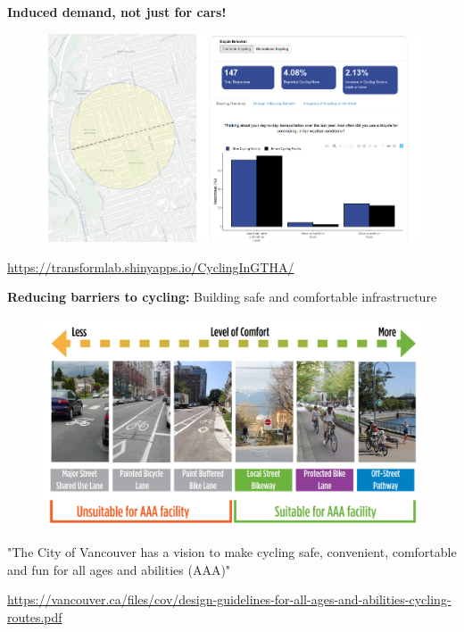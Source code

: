 \documentclass[aspectratio=169]{beamer}
\begin{document}
\begin{frame}
	
	\textbf{Induced demand, not just for cars!}
	
	\begin{figure}
		\centering
		\includegraphics[width=0.95\linewidth]{images/ryerson_cycle_danforth.png}
	\end{figure}
	
	\tiny\url{https://transformlab.shinyapps.io/CyclingInGTHA/}
	
\end{frame}



\begin{frame}
	
	\textbf{Reducing barriers to cycling:} Building safe and comfortable infrastructure 
	
	\begin{figure}
		\centering
		\includegraphics[width=0.85\linewidth]{images/bike_inf_comfort.png}
	\end{figure}

	\small{"The City of Vancouver has a vision to make cycling safe,
		convenient, comfortable and fun for all ages and abilities
		(AAA)"}
	\vspace{2mm}
	
	\tiny\url{https://vancouver.ca/files/cov/design-guidelines-for-all-ages-and-abilities-cycling-routes.pdf}
	
\end{frame}
\end{document}
